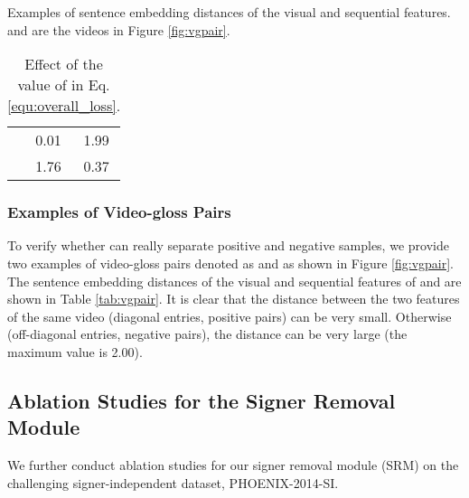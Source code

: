 \documentclass[acmsmall,screen]{acmart}
\begin{document}
\begin{table}[t]
\begin{minipage}{.5\linewidth}
    \caption{Examples of sentence embedding distances of the visual and sequential features.  and  are the videos in Figure \ref{fig:vgpair}.}
    \centering
    \begin{tabular}{c|cc}
    	\toprule
         &  &  \\
        \midrule
         & 0.01 & 1.99 \\
         & 1.76 & 0.37 \\
        \bottomrule
    \end{tabular}
    \label{tab:vgpair}
    \end{minipage}\begin{minipage}{.5\linewidth}
    \centering
    \vspace{20pt}
\caption{Effect of the value of  in Eq. \ref{equ:overall_loss}.}
    \label{tab:lambda}
    \end{minipage}
\end{table} 
\subsubsection{Examples of Video-gloss Pairs}
To verify whether  can really separate positive and negative samples, we provide two examples of video-gloss pairs denoted as  and  as shown in Figure \ref{fig:vgpair}.
The sentence embedding distances of the visual and sequential features of  and  are shown in Table \ref{tab:vgpair}. 
It is clear that the distance between the two features of the same video (diagonal entries, positive pairs) can be very small. 
Otherwise (off-diagonal entries, negative pairs), the distance can be very large (the maximum value is 2.00).


\subsection{Ablation Studies for the Signer Removal Module}
We further conduct ablation studies for our signer removal module (SRM) on the challenging signer-independent dataset, PHOENIX-2014-SI.
\end{document}
